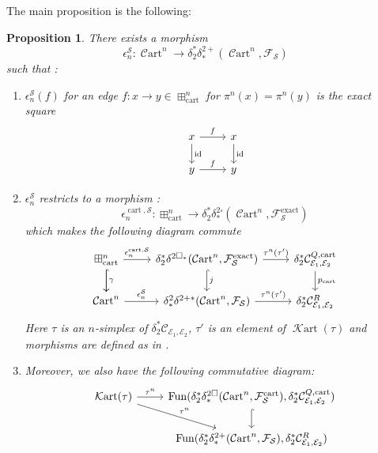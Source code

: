 \documentclass[14pt]{article}
\newtheorem{proposition}[theorem]{Proposition}
\theoremstyle{definition}
\newcommand{\E}{\mathcal{E}}
\newcommand{\K}{\mathcal{K}}
\newcommand{\op}[1]{\operatorname{#1}}
\renewcommand{\S}{\mathcal{S}}
\newcommand{\C}{\mathcal{C}}
\newcommand{\F}{\mathcal{F}}
\newcommand{\dd}{\delta}
\newcommand{\Ca}{\mathcal{C}}
\numberwithin{subsection}{section}
\newcommand{\bx}{\square}
\newcommand{\Cart}{\op{\C art}}
\newcommand{\Krt}{\op{\K art}}
\begin{document}
The main proposition is the following:
\begin{proposition}\label{Proposition: Key Prop for pcart non adm}
 There exists a  morphism 
\begin{equation}
    \epsilon_n^{\S} : \Cart^n \to \dd^*_2\dd^{2+}_*(\Cart^n,\F_{\S})
\end{equation}
such that :
\begin{enumerate}
    \item  $\epsilon_n^{\S}(f)$ for an edge $f: x \to y \in \boxplus^n_{\op{cart}}$ for $\pi^n(x)=\pi^n(y)$ is the exact square
    \begin{equation}
      \begin{tikzcd}
          x \arrow[d,"\op{id}"] \arrow[r,"f"] & x \arrow[d,"\op{id}"] \\
          y \arrow[r,"f"] & y
      \end{tikzcd}
      \end{equation}
      \item $\epsilon_n^{\S}$ restricts to a morphism :
      \begin{equation}
        \epsilon^{\op{cart},\S}_n: \boxplus^n_{\op{cart}} \to \dd^*_2\dd^{2\bx}_*(\Cart^n,\F^{\op{exact}}_{\S})
      \end{equation}
     which makes the following diagram commute
      \begin{equation}
          \begin{tikzcd}
               \boxplus^n_{\op{cart}}\arrow[r,"\epsilon_n^{\op{cart},\S}"] \arrow[d,hookrightarrow] \arrow[d,"\gamma"] & \dd^*_2\dd^{2\bx_*}(\Cart^n,\F_{\S}^{\op{exact}}) \arrow[d,hookrightarrow,"j"] \arrow[r,"\tau^n(\tau')"]& \dd^*_2\Ca^{Q,\op{cart}}_{\E_1,\E_2} \arrow[d,"p_{\op{cart}}"] \\
        \Cart^n \arrow[r,"\epsilon_n^{\S}"] & \dd^2_*\dd^{2+*}(\Cart^n,\F_{\S}) \arrow[r,"\tau^n(\tau')"] & \dd^*_2\Ca^R_{\E_1,\E_2}
          \end{tikzcd}
         \end{equation}
         Here $\tau$ is an $n$-simplex of $\dd^*_2\Ca_{\E_1,\E_2}$, $\tau'$ is an element of $\Krt(\tau)$ and morphisms are defined as in \cite[Proposition 5.1.15]{chowdhury2025sixfunctorformalismsii}.
         \item Moreover,  we also have the following commutative diagram:
         \begin{equation}
    \begin{tikzcd}
        \Krt(\tau) \arrow[r," \tau^n"] \arrow[dr,"\tau^n"] & \op{Fun}( \delta^*_2\delta^{2\bx}_*(\Cart^n,\F_{\S}^{\op{cart}}),\dd^*_2\Ca^{Q,\op{cart}}_{\E_1,\E_2}) \arrow[d,hookrightarrow]\\
        {} & \op{Fun}(\dd^*_2\dd^{2+}_*(\Cart^n,\F_{\S}),\dd^*_2\Ca^R_{\E_1,\E_2})
    \end{tikzcd}
\end{equation}
         
\end{enumerate}

\end{proposition}
\end{document}
